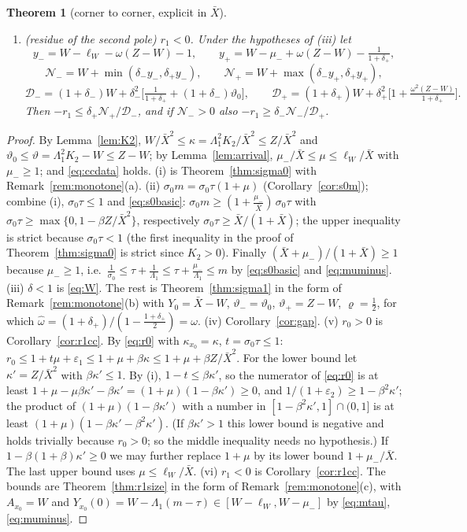 \documentclass[11pt,a4paper]{article}
\newcommand{\Xb}{\bar X}
\theoremstyle{plain}
\newtheorem{theorem}{Theorem}[section]
\theoremstyle{definition}
\numberwithin{equation}{section}
\begin{document}
\begin{theorem}[corner to corner, explicit in $\Xb$]
\begin{enumerate}
(the first inequality provided $\beta(1+\beta)Z\le\Xb^2$). Moreover $r_0>1$ without any hypothesis on $\Xb$ (Theorem~\ref{thm:r0gt1}).
\item[(vi)] \emph{(residue of the second pole)} $r_1<0$. Under the hypotheses of (iii) let
\[
y_-=W-\ell_W-\omega(Z-W)-1,\qquad y_+=W-\mu_-+\omega(Z-W)-\tfrac{1}{1+\delta_+},
\]
\[
\mathcal N_-=W+\min(\delta_-y_-,\delta_+y_-),\qquad\mathcal N_+=W+\max(\delta_-y_+,\delta_+y_+),
\]
\[
\mathcal D_-=(1+\delta_-)W+\delta_-^2\Big[\tfrac1{1+\delta_+}+(1+\delta_-)\vartheta_0\Big],\qquad
\mathcal D_+=(1+\delta_+)W+\delta_+^2\Big[1+\tfrac{\omega^2(Z-W)}{1+\delta_+}\Big].
\]
Then $-r_1\le\delta_+\mathcal N_+/\mathcal D_-$, and if $\mathcal N_->0$ also $-r_1\ge\delta_-\mathcal N_-/\mathcal D_+$.
\end{enumerate}
\end{theorem}
\begin{proof}
By Lemma~\ref{lem:K2}, $W/\Xb^2\le\kappa=\Lambda_1^2K_2/\Xb^2\le Z/\Xb^2$ and $\vartheta_0\le\vartheta=\Lambda_1^2K_2-W\le Z-W$; by Lemma~\ref{lem:arrival}, $\mu_-/\Xb\le\mu\le\ell_W/\Xb$ with $\mu_-\ge1$; and \eqref{eq:ccdata} holds.
(i) is Theorem~\ref{thm:sigma0} with Remark~\ref{rem:monotone}(a).
(ii) $\sigma_0m=\sigma_0\tau(1+\mu)$ (Corollary~\ref{cor:s0m}); combine (i), $\sigma_0\tau\le1$ and \eqref{eq:s0basic}: $\sigma_0m\ge(1+\frac{\mu_-}{\Xb})\,\sigma_0\tau$ with $\sigma_0\tau\ge\max\{0,1-\beta Z/\Xb^2\}$, respectively $\sigma_0\tau\ge\Xb/(1+\Xb)$; the upper inequality is strict because $\sigma_0\tau<1$ (the first inequality in the proof of Theorem~\ref{thm:sigma0} is strict since $K_2>0$). Finally $(\Xb+\mu_-)/(1+\Xb)\ge1$ because $\mu_-\ge1$, i.e.\ $\frac1{\sigma_0}\le\tau+\frac1{\Lambda_1}\le\tau+\frac{\mu_-}{\Lambda_1}\le m$ by \eqref{eq:s0basic} and \eqref{eq:muminus}.
(iii) $\delta<1$ is \eqref{eq:W}. The rest is Theorem~\ref{thm:sigma1} in the form of Remark~\ref{rem:monotone}(b) with $Y_0=\Xb-W$, $\vartheta_-=\vartheta_0$, $\vartheta_+=Z-W$, $\varrho=\frac12$, for which $\hat\omega=(1+\delta_+)/(1-\frac{1+\delta_+}2)=\omega$.
(iv) Corollary~\ref{cor:gap}.
(v) $r_0>0$ is Corollary~\ref{cor:r1cc}. By \eqref{eq:r0} with $\kappa_{x_0}=\kappa$, $t=\sigma_0\tau\le1$: $r_0\le1+t\mu+\varepsilon_1\le1+\mu+\beta\kappa\le1+\mu+\beta Z/\Xb^2$. For the lower bound let $\kappa'=Z/\Xb^2$ with $\beta\kappa'\le1$. By (i), $1-t\le\beta\kappa'$, so the numerator of \eqref{eq:r0} is at least $1+\mu-\mu\beta\kappa'-\beta\kappa'=(1+\mu)(1-\beta\kappa')\ge0$, and $1/(1+\varepsilon_2)\ge1-\beta^2\kappa'$; the product of $(1+\mu)(1-\beta\kappa')$ with a number in $[1-\beta^2\kappa',1]\cap(0,1]$ is at least $(1+\mu)(1-\beta\kappa'-\beta^2\kappa')$. (If $\beta\kappa'>1$ this lower bound is negative and holds trivially because $r_0>0$; so the middle inequality needs no hypothesis.) If $1-\beta(1+\beta)\kappa'\ge0$ we may further replace $1+\mu$ by its lower bound $1+\mu_-/\Xb$. The last upper bound uses $\mu\le\ell_W/\Xb$.
(vi) $r_1<0$ is Corollary~\ref{cor:r1cc}. The bounds are Theorem~\ref{thm:r1size} in the form of Remark~\ref{rem:monotone}(c), with $A_{x_0}=W$ and $Y_{x_0}(0)=W-\Lambda_1(m-\tau)\in[W-\ell_W,W-\mu_-]$ by \eqref{eq:mtau}, \eqref{eq:muminus}.
\end{proof}
\end{document}

